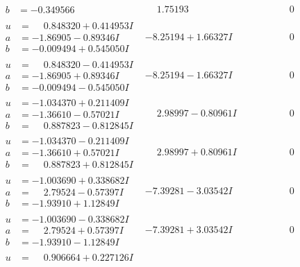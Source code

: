 \documentclass[1p]{elsarticle_modified}
\theoremstyle{definition}
\begin{document}
$$\begin{array}{c|c|c}
\begin{aligned}
b &= -0.349566\phantom{ +0.000000I}\end{aligned}
 & \phantom{-}1.75193\phantom{ +0.000000I} & \phantom{-0.000000 } 0 \\ \hline\begin{aligned}
u &= \phantom{-}0.848320 + 0.414953 I \\
a &= -1.86905 - 0.89346 I \\
b &= -0.009494 + 0.545050 I\end{aligned}
 & -8.25194 + 1.66327 I & \phantom{-0.000000 } 0 \\ \hline\begin{aligned}
u &= \phantom{-}0.848320 - 0.414953 I \\
a &= -1.86905 + 0.89346 I \\
b &= -0.009494 - 0.545050 I\end{aligned}
 & -8.25194 - 1.66327 I & \phantom{-0.000000 } 0 \\ \hline\begin{aligned}
u &= -1.034370 + 0.211409 I \\
a &= -1.36610 - 0.57021 I \\
b &= \phantom{-}0.887823 - 0.812845 I\end{aligned}
 & \phantom{-}2.98997 - 0.80961 I & \phantom{-0.000000 } 0 \\ \hline\begin{aligned}
u &= -1.034370 - 0.211409 I \\
a &= -1.36610 + 0.57021 I \\
b &= \phantom{-}0.887823 + 0.812845 I\end{aligned}
 & \phantom{-}2.98997 + 0.80961 I & \phantom{-0.000000 } 0 \\ \hline\begin{aligned}
u &= -1.003690 + 0.338682 I \\
a &= \phantom{-}2.79524 - 0.57397 I \\
b &= -1.93910 + 1.12849 I\end{aligned}
 & -7.39281 - 3.03542 I & \phantom{-0.000000 } 0 \\ \hline\begin{aligned}
u &= -1.003690 - 0.338682 I \\
a &= \phantom{-}2.79524 + 0.57397 I \\
b &= -1.93910 - 1.12849 I\end{aligned}
 & -7.39281 + 3.03542 I & \phantom{-0.000000 } 0 \\ \hline\begin{aligned}
u &= \phantom{-}0.906664 + 0.227126 I \\

\end{aligned}
\end{array}$$
\end{document}
